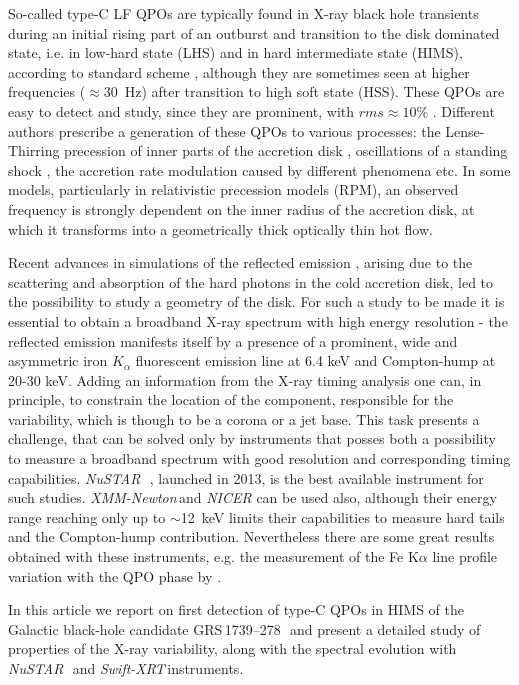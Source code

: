 \documentclass[a4paper,fleqn,usenatbib]{mnras}
\def\grs{{GRS\,1739--278\,}}
\def\swiftx{{\em Swift-XRT\,}}
\def\xmm{{\em XMM-Newton\,}}
\def\nustar{{\em NuSTAR\,}}
\begin{document}
So-called type-C LF QPOs are typically found in X-ray black hole transients during an initial rising part of an outburst and transition to the disk dominated state, i.e. in low-hard state (LHS) and in hard intermediate state (HIMS), according to standard scheme \citep{tanaka96,grebenev97, remillard06, belloni10}, although they are sometimes seen at higher frequencies ($\approx$30~Hz) after transition to high soft state (HSS). These QPOs are easy to detect and study, since they are prominent, with $rms\approx10\%$ \citep{casella05}. 
Different authors prescribe a generation of these QPOs to various processes: the Lense-Thirring precession of inner parts of the accretion disk \citep{stella98, ingram09}, oscillations of a standing shock \citep{molteni96}, the accretion rate modulation caused by different phenomena \citep{tagger99,cabanac10} etc. 
In some models, particularly in relativistic precession models (RPM), an observed frequency is strongly dependent on the inner radius of the accretion disk, at which it transforms into a geometrically thick optically thin hot flow. 

Recent advances in simulations of the reflected emission \citep{ross05,garcia14}, arising due to the scattering and absorption of the hard photons in the cold accretion disk, led to the possibility to study a geometry of the disk.  
For such a study to be made it is essential to obtain a broadband X-ray spectrum with high energy resolution - the reflected emission manifests itself by a presence of a prominent, wide and asymmetric iron $K_{\alpha}$ fluorescent emission line at 6.4 keV and Compton-hump at 20-30 keV. 
Adding an information from the X-ray timing analysis one can, in principle, to constrain the location of the component, responsible for the variability, which is though to be a corona or a jet base.
This task presents a challenge, that can be solved only by instruments that posses both a possibility to measure a broadband spectrum with good resolution and corresponding timing capabilities. 
\nustar\, \citep{harrison13_nust}, launched in 2013, is the best available instrument for such studies. 
\xmm and {\it NICER} can be used also, although their energy range reaching only up to $\sim$12~keV limits their capabilities to measure hard tails and the Compton-hump contribution.
Nevertheless there are some great results obtained with these instruments, e.g. the measurement of the Fe K$\alpha$ line profile variation with the QPO phase by \citet[][]{ingram16}. 

In this article we report on first detection of type-C QPOs in HIMS of the Galactic black-hole candidate \grs\, and present a detailed study of properties of the X-ray variability, along with the spectral evolution with \nustar\ and \swiftx instruments.
\end{document}
